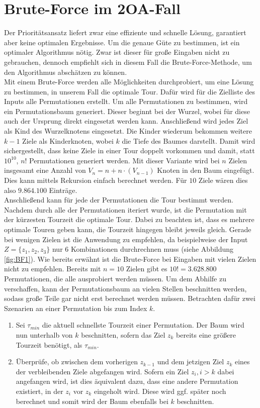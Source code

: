 \documentclass[german,version-2019-11]{uzl-thesis}
\begin{document}
\section{Brute-Force im 2OA-Fall}

Der Prioritätsansatz liefert zwar eine effiziente und schnelle Lösung, garantiert aber keine optimalen Ergebnisse. Um die genaue Güte zu bestimmen, ist ein optimaler Algorithmus nötig. Zwar ist dieser für große Eingaben nicht zu gebrauchen, dennoch empfiehlt sich in diesem Fall die Brute-Force-Methode, um den Algorithmus abschätzen zu können. \\
Mit einem Brute-Force werden alle Möglichkeiten durchprobiert, um eine Lösung zu bestimmen, in unserem Fall die optimale Tour. Dafür wird für die Zielliste des Inputs alle Permutationen erstellt. Um alle Permutationen zu bestimmen, wird ein Permutationsbaum generiert. Dieser beginnt bei der Wurzel, wobei für diese auch der Ursprung direkt eingesetzt werden kann. Anschließend wird jedes Ziel als Kind des Wurzelknotens eingesetzt. Die Kinder wiederum bekommen weitere $k-1$ Ziele als Kinderknoten, wobei $k$ die Tiefe des Baumes darstellt. Damit wird sichergestellt, dass keine Ziele in einer Tour doppelt vorkommen und damit, statt $10^{10}$, $n!$ Permutationen generiert werden. Mit dieser Variante wird bei $n$ Zielen insgesamt eine Anzahl von $V_n = n + n\cdot (V_{n-1})$ Knoten in den Baum eingefügt. Dies kann mittels Rekursion einfach berechnet werden. Für $10$ Ziele wären dies also $9.864.100$ Einträge.\\
Anschließend kann für jede der Permutationen die Tour bestimmt werden. Nachdem durch alle der Permutationen iteriert wurde, ist die Permutation mit der kürzesten Tourzeit die optimale Tour. Dabei zu beachten ist, dass es mehrere optimale Touren geben kann, die Tourzeit hingegen bleibt jeweils gleich. Gerade bei wenigen Zielen ist die Anwendung zu empfehlen, da beispielweise der Input $Z=\{z_1, z_2, z_3\}$ nur 6 Kombinationen durchrechnen muss (siehe Abbildung \ref{fig:BF1}). Wie bereits erwähnt ist die Brute-Force bei Eingaben mit vielen Zielen nicht zu empfehlen. Bereits mit $n=10$ Zielen gibt es $10! = 3.628.800$ Permutationen, die alle ausprobiert werden müssen. Um dem Abhilfe zu verschaffen, kann der Permutationsbaum an vielen Stellen beschnitten werden, sodass große Teile gar nicht erst berechnet werden müssen. Betrachten dafür zwei Szenarien an einer Permutation bis zum Index $k$.
\begin{enumerate}
\item
Sei $\tau_{min}$ die aktuell schnellste Tourzeit einer Permutation. Der Baum wird nun unterhalb von $k$ beschnitten, sofern das Ziel $z_k$ bereits eine größere Tourzeit benötigt, als $\tau_{min}$. 

\item
Überprüfe, ob zwischen dem vorherigen $z_{k-1}$ und dem jetzigen Ziel $z_{k}$ eines der verbleibenden Ziele abgefangen wird. Sofern ein Ziel $z_{i}, i>k$ dabei angefangen wird, ist dies äquivalent dazu, dass eine andere Permutation existiert, in der $z_i$ vor $z_k$ eingeholt wird. Diese wird ggf. später noch berechnet und somit wird der Baum ebenfalls bei $k$ beschnitten.
\end{enumerate} 
\end{document}

